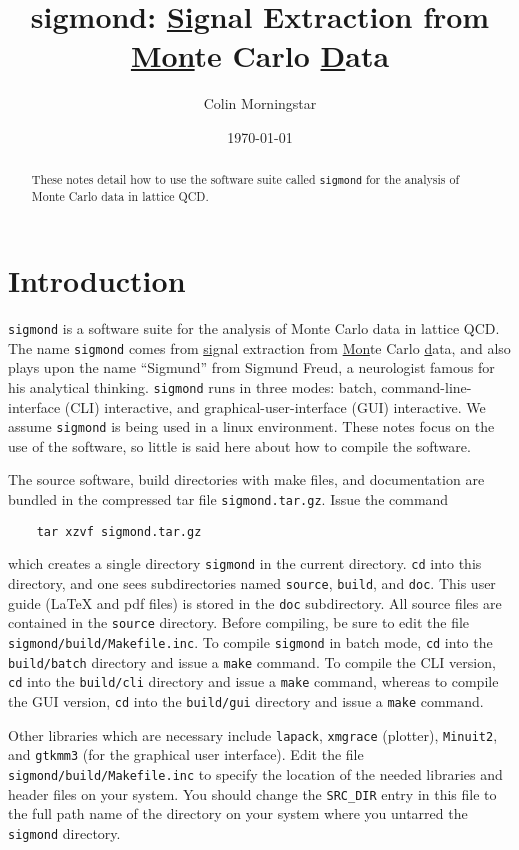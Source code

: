 \documentclass[12pt]{article}
\newcommand{\sigmond}{\texttt{sigmond} }
\newcommand{\vb}{\texttt}
\begin{document}
\title{\bf sigmond: \underline{Sig}nal Extraction from\\ 
\underline{Mon}te Carlo 
\underline{D}ata}
\author{Colin Morningstar}
\date{\today}
\maketitle
\begin{abstract}
These notes detail how to use the software suite called \sigmond for
the analysis of Monte Carlo data in lattice QCD.
\end{abstract}

\section{Introduction}

\sigmond is a software suite for the analysis of Monte Carlo data in 
lattice QCD.  The name \texttt{sigmond} comes from \underline{sig}nal 
extraction from \underline{Mon}te Carlo \underline{d}ata, and also plays 
upon the name ``Sigmund'' from Sigmund Freud, a neurologist famous for 
his analytical thinking.  \sigmond runs in three modes: batch, 
command-line-interface (CLI) interactive, and 
graphical-user-interface (GUI) interactive. We assume \sigmond is being used
in a linux environment.  These notes focus on the use of the software,
so little is said here about how to compile the software.

The source software, build directories with make files, and documentation
are bundled in the compressed tar file \vb{sigmond.tar.gz}.  Issue the
command
\begin{verbatim}
    tar xzvf sigmond.tar.gz
\end{verbatim}
which creates a single directory \vb{sigmond} in the current directory.
\vb{cd} into this directory, and one sees subdirectories named \vb{source}, 
\vb{build}, and \vb{doc}.  This user guide (LaTeX and pdf files)
is stored in the \vb{doc} subdirectory.  All source files are contained in 
the \vb{source} directory.   Before compiling, be sure to edit the file 
\vb{sigmond/build/Makefile.inc}.  To compile \vb{sigmond} in batch mode, 
\vb{cd} into the \vb{build/batch} directory and 
issue a \vb{make} command.  To compile the CLI version, \vb{cd} into the 
\vb{build/cli} directory and issue a \vb{make} command, whereas to compile
the GUI version, \vb{cd} into the \vb{build/gui} directory and 
issue a \vb{make} command.

Other libraries which are necessary include \vb{lapack}, \vb{xmgrace} (plotter), \vb{Minuit2},
and \vb{gtkmm3} (for the graphical user interface).  Edit the file
\vb{sigmond/build/Makefile.inc} to specify the location of the needed
libraries and header files on your system.  You should change the \vb{SRC\_DIR}
entry in this file to the full path name of the directory on your system
where you untarred the \vb{sigmond} directory.
\end{document}
